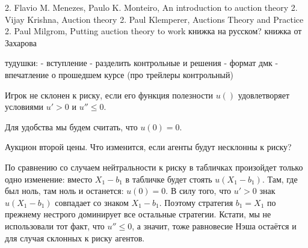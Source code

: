2.	Flavio M. Menezes, Paulo K. Monteiro, An introduction to auction theory
2.	Vijay Krishna, Auction theory
2.	Paul Klemperer, Auctions Theory and Practice
2.	Paul Milgrom, Putting auction theory to work
книжка на русском?
книжка от Захарова

тудушки:
- вступление
- разделить контрольные и решения
- формат дмк
- впечатление о прошедшем курсе (про трейлеры контрольный)



\begin{mydef}
Игрок не склонен к риску, если его функция полезности $ u() $ удовлетворяет условиями $ u'>0 $ и $ u''\leq 0 $.
\end{mydef}

Для удобства мы будем считать, что $ u(0)=0 $.

Аукцион второй цены. Что изменится, если агенты будут несклонны к риску?

По сравнению со случаем нейтральности к риску в табличках произойдет только одно изменение: вместо $ X_{1}-b_{1} $ в табличке будет стоять $ u(X_{1}-b_{1}) $. Там, где был ноль, там ноль и останется: $ u(0)=0 $. В силу того, что $ u'>0 $ знак $ u(X_{1}-b_{1}) $ совпадает со знаком $ X_{1}-b_{1} $. Поэтому стратегия $ b_{1}=X_{1} $ по прежнему нестрого доминирует все остальные стратегии. Кстати, мы не использовали  тот факт, что $u''\leq 0 $, а значит, тоже равновесие Нэша остаётся и для случая склонных к риску агентов.









